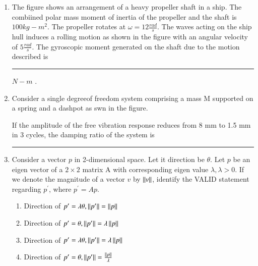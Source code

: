 \documentclass[journal]{IEEEtran}
\numberwithin{equation}{enumi}
\numberwithin{figure}{enumi}
\begin{document}
\begin{enumerate}
		\hfill{}

	\item The figure shows an arrangement of a heavy propeller shaft in a ship. The combiined polar mass moment of inertia of the propeller and the shaft is $100 kg-m^2$. The propeller rotates at $\omega = 12 \frac{rad}{s}$. The waves acting on the ship hull induces a rolling motion as shown in the figure with an angular velocity of $5 \frac{rad}{s}$. The gyroscopic moment generated on the shaft due to the motion described is \rule{1cm}{0.1pt} $N-m$ . 

		\begin{figure}[H]  
                \centering
                \resizebox{0.7\textwidth}{!}{}
                \end{figure}

		\hfill{}

	\item Consider a single degreeof freedom system comprising a mass M supported on a spring and a dashpot as swn in the figure.

		\begin{figure}[H]
                \centering
                \resizebox{0.4\textwidth}{!}{}
                \end{figure}

	If the amplitude of the free vibration response reduces from 8 mm to 1.5 mm in 3 cycles, the damping ratio of the system is \rule{1cm}{0.1pt} 

		\hfill{}

\item Consider a vector $p$ in 2-dimensional space. Let it direction  be $\theta$. Let $p$ be an eigen vector of a $2 \times 2$ matrix A with corresponding eigen value $\lambda, \lambda > 0$. If we denote the magnitude of a vector $v$ by $\left\lVert v\right\rVert$, identify the VALID statement regarding $p^{\prime}$, where $p^{\prime} = Ap$.
		
		\hfill{}
		
		\begin{enumerate}
			\item Direction of $p^{\prime} = \lambda \theta, \left\lVert p^{\prime}\right\rVert = \left\lVert p\right\rVert$
			\item Direction of $p^{\prime} = \theta, \left\lVert p^{\prime}\right\rVert = \lambda \left\lVert p\right\rVert$
			\item Direction of $p^{\prime} = \lambda \theta, \left\lVert p^{\prime}\right\rVert = \lambda \left\lVert p\right\rVert$
			\item Direction of $p^{\prime} = \theta, \left\lVert p^{\prime}\right\rVert = \frac{\left\lVert p\right\rVert}{\lambda}$
		\end{enumerate}


\end{enumerate}
\end{document}
